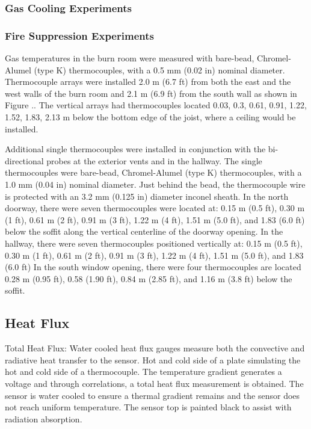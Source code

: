 \documentclass[12pt,oneside]{book}
\begin{document}
\subsubsection{Gas Cooling Experiments}
\label{subsubsec:Gas_Cooling_Temperature_Instrumentation}

\subsubsection{Fire Suppression Experiments}
\label{subsubsec:Fire_Suppression_Temperature_Instrumentation}

Gas temperatures in the burn room were measured with bare-bead, Chromel-Alumel (type K) thermocouples, with a 0.5 mm (0.02 in) nominal diameter.  Thermocouple arrays were installed 2.0 m (6.7 ft) from both the east and the west walls of the burn room and 2.1 m (6.9 ft) from the south wall as shown in Figure ..  The vertical arrays had thermocouples located 0.03, 0.3, 0.61, 0.91, 1.22, 1.52, 1.83, 2.13 m below the bottom edge of the joist, where a ceiling would be installed.   

Additional single thermocouples were installed in conjunction with the bi-directional probes at the exterior vents and in the hallway.  The single thermocouples were bare-bead, Chromel-Alumel (type K) thermocouples, with a 1.0 mm (0.04 in) nominal diameter. Just behind the bead, the thermocouple wire is protected with an 3.2 mm (0.125 in) diameter inconel sheath.  
In the north doorway, there were seven thermocouples were located at: 0.15 m (0.5 ft), 0.30 m (1 ft), 0.61 m (2 ft), 0.91 m (3 ft), 1.22 m (4 ft), 1.51 m (5.0 ft), and 1.83 (6.0 ft) below the soffit along the vertical centerline of the doorway opening.  In the hallway, there were seven thermocouples positioned vertically at: 0.15 m (0.5 ft), 0.30 m (1 ft), 0.61 m (2 ft), 0.91 m (3 ft), 1.22 m (4 ft), 1.51 m (5.0 ft), and 1.83 (6.0 ft)   In the south window opening, there were four thermocouples are located 0.28 m (0.95 ft), 0.58 (1.90 ft), 0.84 m (2.85 ft), and 1.16 m (3.8 ft) below the soffit.  

\subsection{Heat Flux}
\label{subsec:Heat_Flux}

Total Heat Flux:
Water cooled heat flux gauges measure both the convective and radiative heat transfer to the sensor.  Hot and cold side of a plate simulating the hot and cold side of a thermocouple.  The temperature gradient generates a voltage and through correlations, a total heat flux measurement is obtained.  The sensor is water cooled to ensure a thermal gradient remains and the sensor does not reach uniform temperature.  The sensor top is painted black to assist with radiation absorption.
\end{document}
